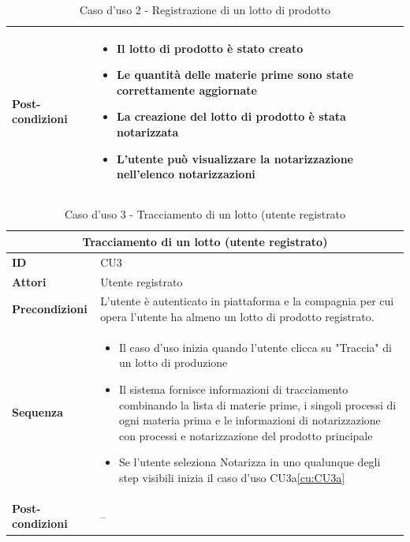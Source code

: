 \documentclass[a4paper,11pt]{article}
\begin{document}
\begin{table}[H]
\begin{tabular}{|m{2cm}|m{10.5cm}|}
    \multicolumn{1}{|l|}{\textbf{Post-condizioni}} &
    \begin{itemize}
      \item Il lotto di prodotto è stato creato
      \item Le quantità delle materie prime sono state correttamente aggiornate
      \item La creazione del lotto di prodotto è stata notarizzata
      \item L'utente può visualizzare la notarizzazione nell'elenco notarizzazioni
    \end{itemize}
    \\ \hline
  \end{tabular}
  \caption{Caso d'uso 2 - Registrazione di un lotto di prodotto}
  \label{cu:CU2}
\end{table}

\begin{table}[H]
  \centering
  \begin{tabular}{|m{2cm}|m{10.5cm}|}
    \hline
    \multicolumn{2}{|c|}{\textbf{Tracciamento di un lotto (utente registrato)}}                                                                                             \\ \hline
    \multicolumn{1}{|l|}{\textbf{ID}}              & CU3                                                                                                                    \\ \hline
    \multicolumn{1}{|l|}{\textbf{Attori}}          & Utente registrato                                                                                                      \\ \hline
    \multicolumn{1}{|l|}{\textbf{Precondizioni}}   & L'utente è autenticato in piattaforma e la compagnia per cui opera l'utente ha almeno un lotto di prodotto registrato. \\ \hline
    \multicolumn{1}{|l|}{\textbf{Sequenza}}        &

    \begin{itemize}
      \item Il caso d'uso inizia quando l'utente clicca su "Traccia" di un lotto di produzione
      \item Il sistema fornisce informazioni di tracciamento combinando la lista di materie prime, i singoli processi di ogni materia prima e le informazioni di notarizzazione con processi e notarizzazione del prodotto principale
      \item Se l'utente seleziona Notarizza in uno qualunque degli step visibili inizia il caso d'uso CU3a\ref{cu:CU3a}
    \end{itemize}
    \\ \hline
    \multicolumn{1}{|l|}{\textbf{Post-condizioni}} & --                                                                                                                     \\ \hline
  \end{tabular}
  \caption{Caso d'uso 3 - Tracciamento di un lotto (utente registrato}
  \label{cu:CU3}
\end{table}
\end{document}
